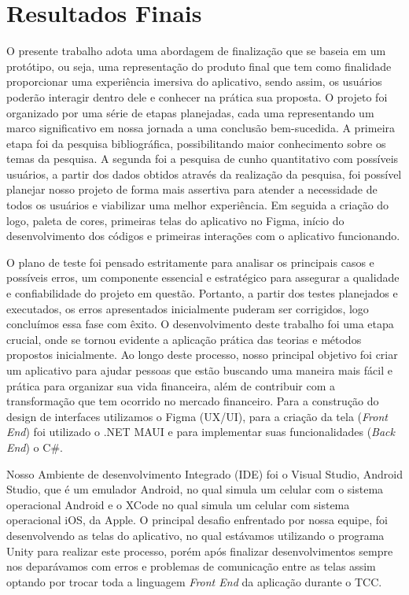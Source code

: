 % 

\chapter[Resultados finais]{Resultados Finais}

O presente trabalho adota uma abordagem de finalização que se baseia em um protótipo, ou seja, uma representação do produto final que tem como finalidade proporcionar uma experiência imersiva do aplicativo, sendo assim, os usuários poderão interagir dentro dele e conhecer na prática sua proposta. O projeto foi organizado por uma série de etapas planejadas, cada uma representando um marco significativo em nossa jornada a uma conclusão bem-sucedida. A primeira etapa foi da pesquisa bibliográfica, possibilitando maior conhecimento sobre os temas da pesquisa. A segunda foi a pesquisa de cunho quantitativo com possíveis usuários, a partir dos dados obtidos através da realização da pesquisa, foi possível planejar nosso projeto de forma mais assertiva para atender a necessidade de todos os usuários e viabilizar uma melhor experiência. Em seguida a criação do logo, paleta de cores, primeiras telas do aplicativo no Figma, início do desenvolvimento dos códigos e primeiras interações com o aplicativo funcionando. 

O plano de teste foi pensado estritamente para analisar os principais casos e possíveis erros, um componente essencial e estratégico para assegurar a qualidade e confiabilidade do projeto em questão. Portanto, a partir dos testes planejados e executados, os erros apresentados inicialmente puderam ser corrigidos, logo concluímos essa fase com êxito.
O desenvolvimento deste trabalho foi uma etapa crucial, onde se tornou evidente a aplicação prática das teorias e métodos propostos inicialmente. Ao longo deste processo, nosso principal objetivo foi criar um aplicativo para ajudar pessoas que estão buscando uma maneira mais fácil e prática para organizar sua vida financeira, além de contribuir com a transformação que tem ocorrido no mercado financeiro. Para a construção do design de interfaces utilizamos o Figma (UX/UI), para a criação da tela (\textit{Front End}) foi utilizado o .NET MAUI e para implementar suas funcionalidades (\textit{Back End}) o C\#. 

Nosso Ambiente de desenvolvimento Integrado (IDE) foi o Visual Studio, Android Studio, que é um emulador Android, no qual simula um celular com o sistema operacional Android e o XCode no qual simula um celular com sistema operacional iOS, da Apple. O principal desafio enfrentado por nossa equipe, foi desenvolvendo as telas do aplicativo, no qual estávamos utilizando o programa Unity para realizar este processo, porém após finalizar desenvolvimentos sempre nos deparávamos com erros e problemas de comunicação entre as telas assim optando por trocar toda a linguagem \textit{Front End} da aplicação durante o TCC. 

